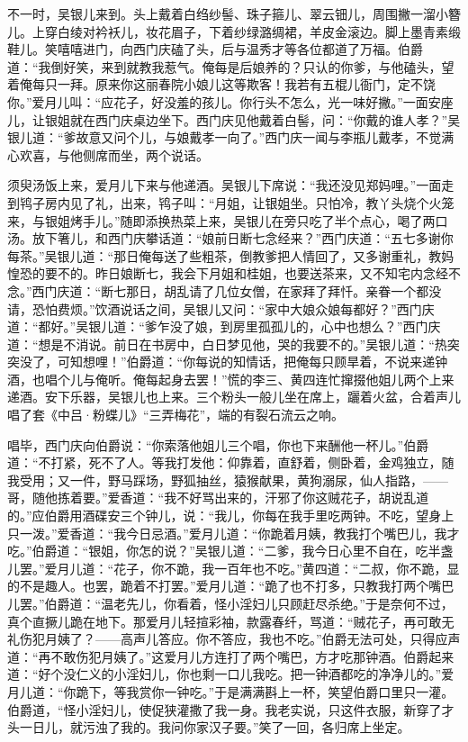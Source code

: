 不一时，吴银儿来到。头上戴着白绉纱髻、珠子箍儿、翠云钿儿，周围撇一溜小簪儿。上穿白绫对衿袄儿，妆花眉子，下着纱绿潞绸裙，羊皮金滚边。脚上墨青素缎鞋儿。笑嘻嘻进门，向西门庆磕了头，后与温秀才等各位都道了万福。伯爵道：“我倒好笑，来到就教我惹气。俺每是后娘养的？只认的你爹，与他磕头，望着俺每只一拜。原来你这丽春院小娘儿这等欺客！我若有五棍儿衙门，定不饶你。”爱月儿叫：“应花子，好没羞的孩儿。你行头不怎么，光一味好撇。”一面安座儿，让银姐就在西门庆桌边坐下。西门庆见他戴着白髻，问：“你戴的谁人孝？”吴银儿道：“爹故意又问个儿，与娘戴孝一向了。”西门庆一闻与李瓶儿戴孝，不觉满心欢喜，与他侧席而坐，两个说话。

须臾汤饭上来，爱月儿下来与他递酒。吴银儿下席说：“我还没见郑妈哩。”一面走到鸨子房内见了礼，出来，鸨子叫：“月姐，让银姐坐。只怕冷，教丫头烧个火笼来，与银姐烤手儿。”随即添换热菜上来，吴银儿在旁只吃了半个点心，喝了两口汤。放下箸儿，和西门庆攀话道：“娘前日断七念经来？”西门庆道：“五七多谢你每茶。”吴银儿道：“那日俺每送了些粗茶，倒教爹把人情回了，又多谢重礼，教妈惶恐的要不的。昨日娘断七，我会下月姐和桂姐，也要送茶来，又不知宅内念经不念。”西门庆道：“断七那日，胡乱请了几位女僧，在家拜了拜忏。亲眷一个都没请，恐怕费烦。”饮酒说话之间，吴银儿又问：“家中大娘众娘每都好？”西门庆道：“都好。”吴银儿道：“爹乍没了娘，到房里孤孤儿的，心中也想么？”西门庆道：“想是不消说。前日在书房中，白日梦见他，哭的我要不的。”吴银儿道：“热突突没了，可知想哩！”伯爵道：“你每说的知情话，把俺每只顾旱着，不说来递钟酒，也唱个儿与俺听。俺每起身去罢！”慌的李三、黄四连忙撺掇他姐儿两个上来递酒。安下乐器，吴银儿也上来。三个粉头一般儿坐在席上，躧着火盆，合着声儿唱了套《中吕·粉蝶儿》“三弄梅花”，端的有裂石流云之响。

唱毕，西门庆向伯爵说：“你索落他姐儿三个唱，你也下来酬他一杯儿。”伯爵道：“不打紧，死不了人。等我打发他：仰靠着，直舒着，侧卧着，金鸡独立，随我受用；又一件，野马踩场，野狐抽丝，猿猴献果，黄狗溺尿，仙人指路，——哥，随他拣着要。”爱香道：“我不好骂出来的，汗邪了你这贼花子，胡说乱道的。”应伯爵用酒碟安三个钟儿，说：“我儿，你每在我手里吃两钟。不吃，望身上只一泼。”爱香道：“我今日忌酒。”爱月儿道：“你跪着月姨，教我打个嘴巴儿，我才吃。”伯爵道：“银姐，你怎的说？”吴银儿道：“二爹，我今日心里不自在，吃半盏儿罢。”爱月儿道：“花子，你不跪，我一百年也不吃。”黄四道：“二叔，你不跪，显的不是趣人。也罢，跪着不打罢。”爱月儿道：“跪了也不打多，只教我打两个嘴巴儿罢。”伯爵道：“温老先儿，你看着，怪小淫妇儿只顾赶尽杀绝。”于是奈何不过，真个直撅儿跪在地下。那爱月儿轻揎彩袖，款露春纤，骂道：“贼花子，再可敢无礼伤犯月姨了？——高声儿答应。你不答应，我也不吃。”伯爵无法可处，只得应声道：“再不敢伤犯月姨了。”这爱月儿方连打了两个嘴巴，方才吃那钟酒。伯爵起来道：“好个没仁义的小淫妇儿，你也剩一口儿我吃。把一钟酒都吃的净净儿的。”爱月儿道：“你跪下，等我赏你一钟吃。”于是满满斟上一杯，笑望伯爵口里只一灌。伯爵道，“怪小淫妇儿，使促狭灌撒了我一身。我老实说，只这件衣服，新穿了才头一日儿，就污浊了我的。我问你家汉子要。”笑了一回，各归席上坐定。

